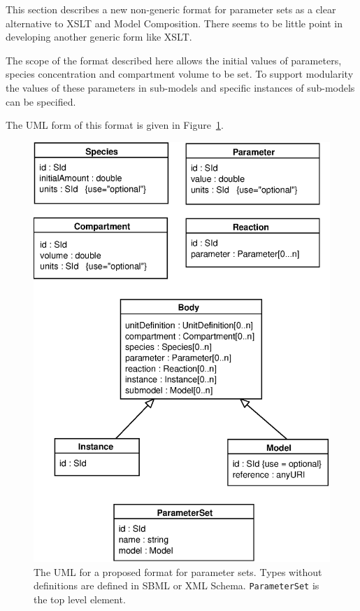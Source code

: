\documentclass[10pt,twocolumntoc]{cekarticle}
\begin{document}
This section describes a new non-generic format for parameter sets as a clear alternative
to XSLT and Model Composition.
There seems to be little point in developing another generic form like XSLT.

The scope of the format described here allows the initial values of parameters, species
concentration and compartment volume to be set.  To support modularity the values of these
parameters in sub-models and specific instances of sub-models can be specified.

The UML form of this format is given in Figure~\ref{fig:uml}.

\begin{figure}[h]
  \vspace*{8pt}
  \centering
  \includegraphics[scale = 0.7]{uml}
  \caption{The UML for a proposed format for parameter sets.  Types without definitions are
  defined in SBML or XML Schema.  \texttt{ParameterSet} is the top level element.}
  \label{fig:uml}
\end{figure}
\end{document}
